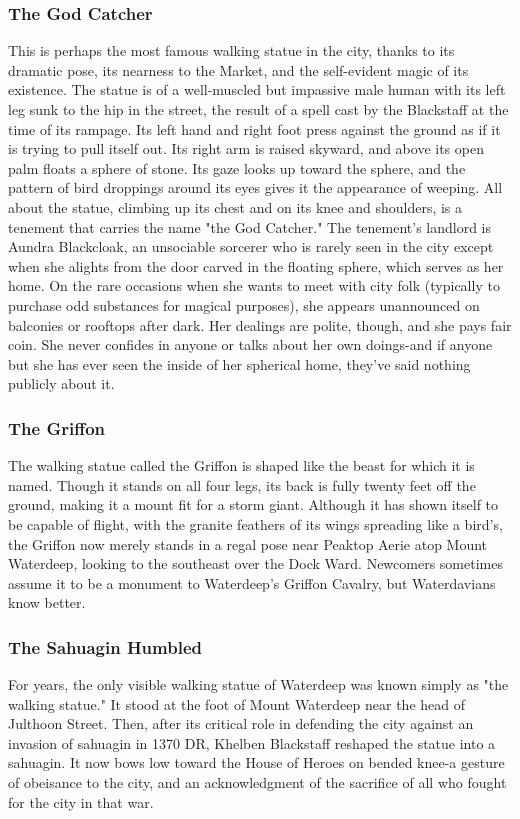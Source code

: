 \documentclass[10pt,a4paper,twoside,twocolumn,openany,nodeprecatedcode]{dndbook}
\begin{document}
\subsubsection{The God Catcher}
This is perhaps the most famous walking statue in the city, thanks to its dramatic pose, its nearness to the Market, and the self-evident magic of its existence. The statue is of a well-muscled but impassive male human with its left leg sunk to the hip in the street, the result of a spell cast by the Blackstaff at the time of its rampage. Its left hand and right foot press against the ground as if it is trying to pull itself out. Its right arm is raised skyward, and above its open palm floats a sphere of stone. Its gaze looks up toward the sphere, and the pattern of bird droppings around its eyes gives it the appearance of weeping.
All about the statue, climbing up its chest and on its knee and shoulders, is a tenement that carries the name "the God Catcher." The tenement's landlord is Aundra Blackcloak, an unsociable sorcerer who is rarely seen in the city except when she alights from the door carved in the floating sphere, which serves as her home. On the rare occasions when she wants to meet with city folk (typically to purchase odd substances for magical purposes), she appears unannounced on balconies or rooftops after dark. Her dealings are polite, though, and she pays fair coin. She never confides in anyone or talks about her own doings-and if anyone but she has ever seen the inside of her spherical home, they've said nothing publicly about it.
\subsubsection{The Griffon}
The walking statue called the Griffon is shaped like the beast for which it is named. Though it stands on all four legs, its back is fully twenty feet off the ground, making it a mount fit for a storm giant. Although it has shown itself to be capable of flight, with the granite feathers of its wings spreading like a bird's, the Griffon now merely stands in a regal pose near Peaktop Aerie atop Mount Waterdeep, looking to the southeast over the Dock Ward. Newcomers sometimes assume it to be a monument to Waterdeep's Griffon Cavalry, but Waterdavians know better.
\subsubsection{The Sahuagin Humbled}
For years, the only visible walking statue of Waterdeep was known simply as "the walking statue." It stood at the foot of Mount Waterdeep near the head of Julthoon Street. Then, after its critical role in defending the city against an invasion of sahuagin in 1370 DR, Khelben Blackstaff reshaped the statue into a sahuagin. It now bows low toward the House of Heroes on bended knee-a gesture of obeisance to the city, and an acknowledgment of the sacrifice of all who fought for the city in that war.
\end{document}
